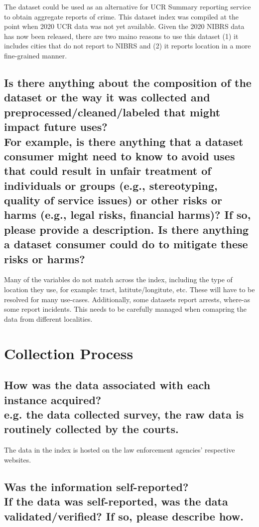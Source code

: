 \documentclass[letterpaper, 10 pt, conference]{ieeeconf}  %
\newcommand{\subtitle}[1]{{\\ \small \normalfont \color{purple} #1}}
\begin{document}
The dataset could be used as an alternative for UCR Summary reporting service to obtain aggregate reports of crime. This dataset index was compiled at the point when 2020 UCR data was not yet available. Given the 2020 NIBRS data has now been released, there are two maino reasons to use this dataset (1) it includes cities that do not report to NIBRS and (2) it reports location in a more fine-grained manner. 

\subsection{Is there anything about the composition of the dataset or the way it was collected and preprocessed/cleaned/labeled that might impact future uses? \subtitle{For example, is there anything that a dataset consumer might need to know to avoid uses that could result in unfair treatment of individuals or groups (e.g., stereotyping, quality of service issues) or other risks or harms (e.g., legal risks, financial harms)? If so, please provide a description. Is there anything a dataset consumer could do to mitigate these risks or harms?}}

Many of the variables do not match across the index, including the type of location they use, for example: tract, latitute/longitute, etc. These will have to be resolved for many use-cases. Additionally, some datasets report arrests, where-as some report incidents. This needs to be carefully managed when comapring the data from different localities.

\section{Collection Process}

\subsection{How was the data associated with each instance acquired? \subtitle {e.g. the data collected survey, the raw data is routinely collected by the courts.}}

The data in the index is hosted on the law enforcement agencies' respective websites.

\subsection{Was the information self-reported? \subtitle{If the data was self-reported, was the data validated/verified? If so, please describe how.}}
\end{document}
